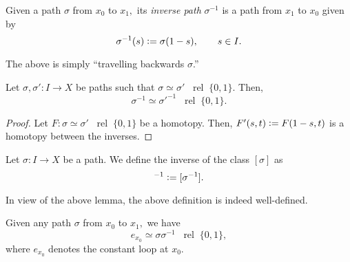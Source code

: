 \documentclass[12pt]{article}
\newcommand{\rel}{\;\;\operatorname{rel}\;}
\begin{document}
\begin{defn}
	Given a path $\sigma$ from $x_0$ to $x_1,$ its \emph{inverse path} $\sigma^{-1}$ is a path from $x_1$ to $x_0$ given by
	\begin{equation*} 
		\sigma^{-1}(s) \vcentcolon= \sigma(1 - s), \qquad s \in I.
	\end{equation*}
\end{defn}
The above is simply ``travelling backwards $\sigma$.''
\begin{lem} 
	Let $\sigma, \sigma':I \to X$ be paths such that $\sigma \simeq \sigma' \rel \{0, 1\}.$ Then,
	\begin{equation*} 
		\sigma^{-1} \simeq \sigma'^{-1} \rel \{0, 1\}.
	\end{equation*}
\end{lem}
\begin{proof} 
	Let $F:\sigma \simeq \sigma' \rel \{0, 1\}$ be a homotopy. Then, $F'(s, t) \vcentcolon= F(1 - s, t)$ is a homotopy between the inverses.
\end{proof}

\begin{defn}
	Let $\sigma:I \to X$ be a path. We define the inverse of the class $[\sigma]$ as
	\begin{equation*} 
		[\sigma]^{-1} \vcentcolon= [\sigma^{-1}].
	\end{equation*}
\end{defn}
In view of the above lemma, the above definition is indeed well-defined.

\begin{lem} \label{lem:prodinv}
	Given any path $\sigma$ from $x_0$ to $x_1,$ we have
	\begin{equation*} 
		e_{x_0} \simeq \sigma\sigma^{-1} \rel \{0, 1\},
	\end{equation*}
	where $e_{x_0}$ denotes the constant loop at $x_0.$
\end{lem}
\end{document}
